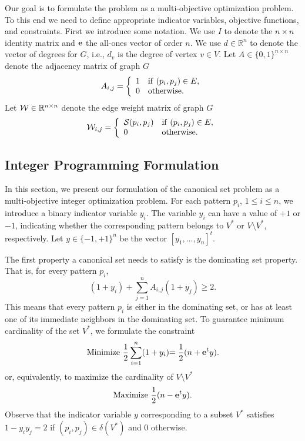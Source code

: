 \documentclass{ieee}
\def\S{{\cal S}}
\def\W{{\cal W}}
\def\SR{{\mathbb{R}}}
\def\e{{\bf e}}
\begin{document}
Our goal is to formulate the problem as a multi-objective optimization 
problem.  To this end we need to define appropriate indicator variables, 
objective functions, and constraints.  First we introduce some notation.  
We  use $I$ to denote the $n\times n$ identity matrix and $\e$ the all-ones 
vector of order $n$.  We  use $d\in \SR^n$ to denote the vector of 
degrees for $G$, i.e.,  $d_v$ is the degree of vertex $v\in V$.  
Let $A\in\{0,1\}^{n\times n}$ denote the adjacency matrix of graph $G$ \\
$$A_{i,j}=\left \{
\begin{array}{ll}
1 & {\rm if}\ (p_i,p_j)\in E,\\
0 & {\rm otherwise.}
\end{array}
\right.
$$ 
Let $\W\in\SR^{n\times n}$ denote the edge weight matrix of graph $G$
$$\W_{i,j}=\left \{
\begin{array}{ll}
\S(p_i,p_j) & {\rm if}\ (p_i,p_j)\in E,\\
0 & {\rm otherwise.}
\end{array}
\right.
$$
\vspace{-0.1in}
\subsection{Integer Programming Formulation}
\label{sec:integer}
\vspace{-0.1in}
In this section, we present our formulation of the canonical set
problem as a multi-objective integer optimization problem.  For each
pattern $p_i$, $1\le i\le n$, we introduce a binary indicator variable
$y_i$.  The variable $y_i$ can have a value of $+1$ or $-1$,
indicating whether the corresponding pattern belongs to $V^*$ or
$V\setminus V^*$, respectively.  Let $y \in \{-1,+1\}^n$ be the vector
$[y_1,\ldots,y_n]^t$.

The first property a canonical  set needs to satisfy is the
dominating set property. That is, for every pattern $p_i$,
\begin{equation}
\label{eq:eq1}
 (1+y_i)+\sum_{j=1}^n A_{i,j}(1+y_j)\ge 2.
\end{equation}
This means that every pattern $p_i$ is either in the dominating set, or 
has at least one of its immediate neighbors in the dominating set.
To guarantee minimum cardinality of the set $V^*$, we formulate the constraint
\begin{equation}
\label{eq:eq3}
{\rm Minimize}\ {\frac{1}{2}}\sum_{i=1}^n (1+y_i) {={\frac{1}{2}}(n+\e^ty).}
\end{equation}
or, equivalently, to maximize the cardinality of $V\setminus V^*$ 
\begin{equation}
\label{eq:eq4}
{\rm Maximize}\ {{\frac{1}{2}}(n-\e^ty).}
\end{equation}
Observe that the indicator variable $y$ corresponding to a subset $V^*$ 
satisfies $1-y_iy_j=2$ if $(p_i,p_j)\in\delta(V^*)$ and 0 otherwise.
\end{document}
